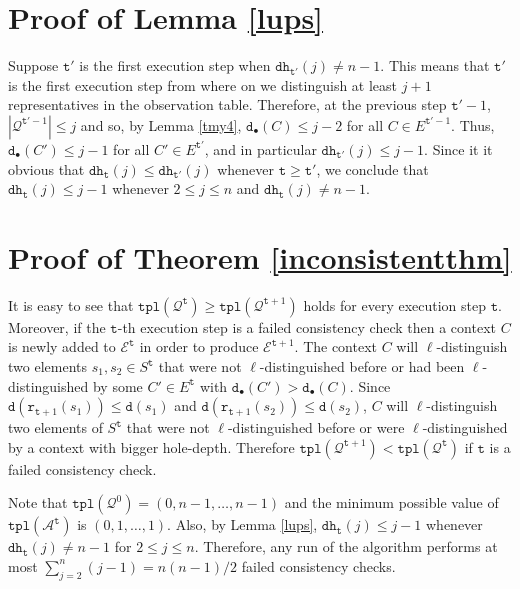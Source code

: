 \documentclass[preprint,12pt,english]{article}
\def\tpl{\mathtt{tpl}}
\def\xpm{\mathtt{dh}}
\def\hole{\bullet}
\def\tr{\mathtt{r}}
\def\cE{\mathcal{E}}
\def\cA{\mathcal{A}}
\def\cQ{\mathcal{Q}}
\def\depth{\mathtt{d}}
\def\ty{\mathtt{t}}
\begin{document}
\section{Proof of Lemma \ref{lups}}
Suppose $\ty'$ is the first execution step when $\xpm_{\ty'}(j)\neq n-1.$ This means that $\ty'$ is the first execution step from where on  we distinguish at least $j+1$ representatives in the observation table. Therefore, at the previous step $\ty'-1$, $|\cQ^{\ty'-1}|\leq j$ and so, by Lemma \ref{tmy4}, $\depth_\hole(C)\leq j-2$ for all $C\in E^{\ty'-1}.$ Thus, $\depth_\hole(C')\leq j-1$ for all $C'\in E^{\ty'}$, and in particular $\xpm_{\ty'}(j)\leq j-1.$ Since it it obvious that $\xpm_\ty(j)\leq\xpm_{\ty'}(j)$ whenever $\ty \geq\ty'$, we conclude that $\xpm_\ty(j)\leq j-1$ whenever $2\leq j\leq n$ and $\xpm_\ty(j)\neq n-1.$
\section{Proof of Theorem \ref{inconsistentthm}}
It is easy to see that  $\tpl(\cQ^\ty)\geq \tpl(\cQ^{\ty+1})$ holds for every execution step $\ty$. Moreover, if the $\ty$-th execution step is a failed consistency check then a  context $C$ is newly added to $\cE^\ty$ in order to produce $\cE^{\ty+1}$. The context $C$ will $\ell$-distinguish two elements $s_1,s_2\in S^\ty$ that were not $\ell$-distinguished before or had been $\ell$-distinguished by some $C'\in E^\ty$ with $\depth_\hole(C')>\depth_\hole(C).$ Since $\depth(\tr_{\ty+1}(s_1))\leq\depth(s_1)$ and $\depth(\tr_{\ty+1}(s_2))\leq\depth(s_2)$, $C$ will $\ell$-distinguish two elements of $S^\ty$ that were not $\ell$-distinguished before or were $\ell$-distinguished by a context with bigger hole-depth. Therefore $\tpl(\cQ^{\ty+1})<\tpl(\cQ^\ty)$ if $\ty$ is a failed  consistency check.

Note that $\tpl(\cQ^0)=(0,n-1,\ldots,n-1)$ and the minimum possible value of $\tpl(\cA^\ty)$ is $(0,1,\ldots,1)$.  Also, by Lemma \ref{lups}, $\xpm_\ty(j)\leq j-1$ whenever $\xpm_\ty(j)\neq n-1$ for $2\leq j\leq n$. Therefore, any run of the algorithm performs at most $\sum_{j=2}^n(j-1)={n(n-1)}/{2}$
failed consistency checks. 
\end{document}
